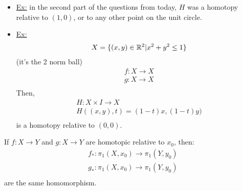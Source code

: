     \begin{itemize}
        \item \underline{Ex:} in the second part of the questions from today, $H$ was a homotopy relative to $(1,0)$, or
            to any other point on the unit circle.
        \item \underline{Ex:}
            \begin{align*}
                X=\{(x,y)\in \mathbb{R}^2 | x^2+y^2\leq 1\}\\
            \end{align*}
            (it's the 2 norm ball)
            \begin{align*}
                f: X\rightarrow X\\
                g: X\rightarrow X\\
            \end{align*}
            Then,
            \begin{align*}
                H: X\times I \rightarrow X\\
                H((x,y),t)=(1-t)x, (1-t)y)\\
            \end{align*}
            is a homotopy relative to $(0,0)$.
    \end{itemize}
        \begin{theorem} If $f:X\rightarrow Y$ and $g:X\rightarrow Y$ are
            homotopic relative to $x_0$, then:
                \begin{align*}
                    f_{*}:\pi_1(X,x_0)\rightarrow \pi_1(Y,y_0)\\
                    g_{*}:\pi_1(X,x_0)\rightarrow \pi_1(Y,y_0)\\
                \end{align*}
                are the same homomorphism.
        \end{theorem}
